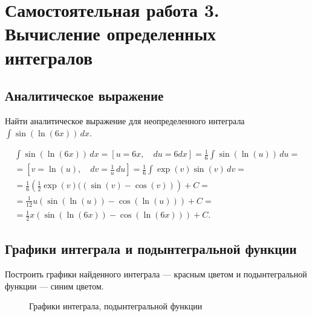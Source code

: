 \documentclass[10pt, a4paper, titlepage]{article}
\begin{document}
\newpage
\section{Самостоятельная работа \textnumero{} 3. Вычисление определенных интегралов}

\subsection*{Аналитическое выражение}

Найти аналитическое выражение для неопределенного интеграла $\int \sin(\ln(6x))\,dx$.

\begin{multline*}
    \int\sin(\ln(6x))\,dx =
    \left[u=6x, \quad du=6dx\right] =
    \frac{1}{6}\int\sin(\ln(u))\,du = \\ =
    \left[v=\ln(u), \quad dv=\frac{1}{u}\,du\right] =
    \frac{1}{6}\int\exp(v)\sin(v)\,dv = \\ =
    \frac{1}{6}\left(\frac{1}{2}\exp(v)((\sin(v)-\cos(v))\right)+C = \\ =
    \frac{1}{12}u(\sin(\ln(u))-\cos(\ln(u)))+C = \\ =
    \frac{1}{2}x(\sin(\ln(6x))-\cos(\ln(6x)))+C.
\end{multline*}

\subsection*{Графики интеграла и подынтегральной функции}

Построить графики найденного интеграла --- красным цветом и подынтегральной функции --- синим цветом.

\begin{figure}[!ht]
    \caption{Графики интеграла, подынтегральной функции}
    \label{sr3Functions}
\end{figure}
\end{document}
